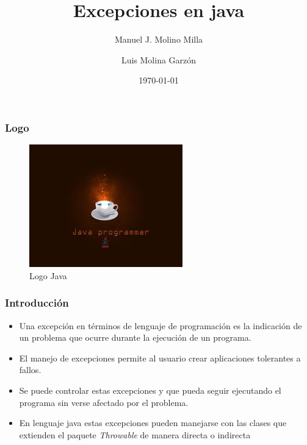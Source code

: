 \documentclass{beamer}
\title{Excepciones en java}
\author{Manuel J. Molino Milla \and Luis Molina Garzón}
\date{\today} %
\institute{IES Virgen del Carmen \and Departamento de Informática}
\begin{document}
\begin{frame}
  \titlepage
\end{frame}

\begin{frame}
    \frametitle{Logo}
\begin{figure}
\includegraphics[scale=1]{imagenes/logo.jpeg} 
\caption{Logo Java}
\end{figure}
\end{frame}


\begin{frame}[fragile]
\frametitle{Introducción}
\begin{itemize}[<+->]
\item Una excepción en términos de lenguaje de programación es la indicación de un problema que ocurre durante la ejecución de un programa.
\item  El manejo de excepciones permite al usuario crear aplicaciones tolerantes a fallos.
\item Se puede controlar estas excepciones y que pueda seguir ejecutando el programa sin verse afectado por el problema. 
\item  En lenguaje java estas excepciones pueden manejarse con las clases que extienden el paquete \emph{Throwable} de manera directa o indirecta
\end{itemize}
\end{frame}
\end{document}
